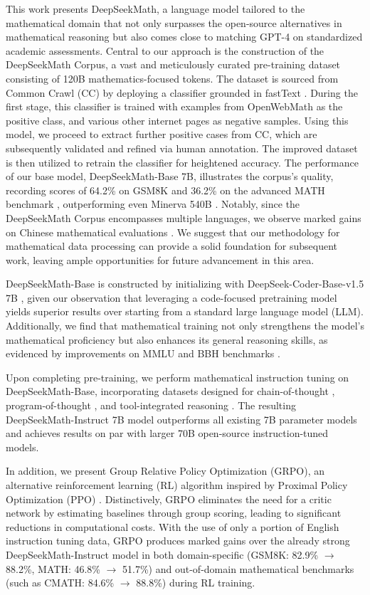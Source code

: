 This work presents DeepSeekMath, a language model tailored to the mathematical domain that not only surpasses the open-source alternatives in mathematical reasoning but also comes close to matching GPT-4 on standardized academic assessments. Central to our approach is the construction of the DeepSeekMath Corpus, a vast and meticulously curated pre-training dataset consisting of 120B mathematics-focused tokens. The dataset is sourced from Common Crawl (CC) by deploying a classifier grounded in fastText \citep{joulin2016fasttext}. During the first stage, this classifier is trained with examples from OpenWebMath \citep{openwebmath} as the positive class, and various other internet pages as negative samples. Using this model, we proceed to extract further positive cases from CC, which are subsequently validated and refined via human annotation. The improved dataset is then utilized to retrain the classifier for heightened accuracy. The performance of our base model, DeepSeekMath-Base 7B, illustrates the corpus’s quality, recording scores of 64.2\% on GSM8K \citep{gsm8k} and 36.2\% on the advanced MATH benchmark \citep{MATH}, outperforming even Minerva 540B \citep{minerva}. Notably, since the DeepSeekMath Corpus encompasses multiple languages, we observe marked gains on Chinese mathematical evaluations \citep{wei2023cmath,agieval}. We suggest that our methodology for mathematical data processing can provide a solid foundation for subsequent work, leaving ample opportunities for future advancement in this area.

DeepSeekMath-Base is constructed by initializing with DeepSeek-Coder-Base-v1.5 7B \citep{deepseek-coder}, given our observation that leveraging a code-focused pretraining model yields superior results over starting from a standard large language model (LLM). Additionally, we find that mathematical training not only strengthens the model's mathematical proficiency but also enhances its general reasoning skills, as evidenced by improvements on MMLU \citep{mmlu} and BBH benchmarks \citep{bbh}.

Upon completing pre-training, we perform mathematical instruction tuning on DeepSeekMath-Base, incorporating datasets designed for chain-of-thought \citep{cot}, program-of-thought \citep{pot,pal}, and tool-integrated reasoning \citep{tora}. The resulting DeepSeekMath-Instruct 7B model outperforms all existing 7B parameter models and achieves results on par with larger 70B open-source instruction-tuned models.

In addition, we present Group Relative Policy Optimization (GRPO), an alternative reinforcement learning (RL) algorithm inspired by Proximal Policy Optimization (PPO) \citep{schulman2017proximal}. Distinctively, GRPO eliminates the need for a critic network by estimating baselines through group scoring, leading to significant reductions in computational costs. With the use of only a portion of English instruction tuning data, GRPO produces marked gains over the already strong DeepSeekMath-Instruct model in both domain-specific (GSM8K: 82.9\% $\rightarrow$ 88.2\%, MATH: 46.8\% $\rightarrow$ 51.7\%) and out-of-domain mathematical benchmarks (such as CMATH: 84.6\% $\rightarrow$ 88.8\%) during RL training. 


